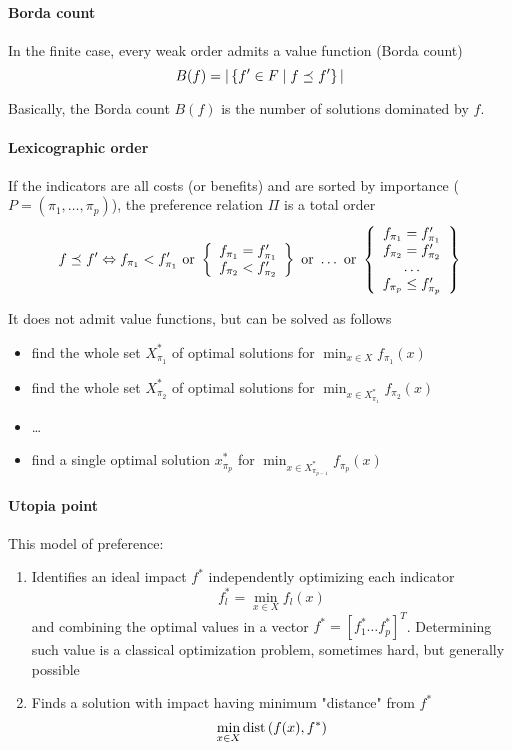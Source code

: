 \paragraph{Borda count} In the finite case, every weak order admits a value function (Borda count)
$$ B(f) = |\left\{f' \in F \mid f \preceq_{} f' \right\}|$$

Basically, the Borda count $B(f)$ is the number of solutions dominated by $f$.

\paragraph{Lexicographic order} If the indicators are all costs (or benefits) and are sorted by importance ($P = (\pi_1, \dots, \pi_p)$), the preference relation $\Pi$ is a total order
$$ f \preceq_{} f' \Leftrightarrow f_{\pi_1} < f_{\pi_1}' \text{ or } \left\{
\begin{array}{c}
	f_{\pi_1} = f_{\pi_1}' \\
	f_{\pi_2} < f_{\pi_2}' 
\end{array}\right\} \text{ or } \dots \text{ or } \left\{\begin{array}{c}
f_{\pi_1} = f_{\pi_1}' \\
f_{\pi_2} = f_{\pi_2}'  \\
\dots  \\
f_{\pi_p} \leq f_{\pi_p}'
\end{array}\right\}
$$

It does not admit value functions, but can be solved as follows
\begin{itemize}
	\item find the whole set $X^\ast_{\pi_1}$ of optimal solutions for $\min_{x \in X} f_{\pi_1}(x)$
	
	\item find the whole set $X^\ast_{\pi_2}$ of optimal solutions for $\min_{x \in X^\ast_{\pi_1}} f_{\pi_2}(x)$
	
	\item \dots
	
	\item find a single optimal solution $x^\ast_{\pi_p}$ for $\min_{x \in X^\ast_{\pi_{p-1}}} f_{\pi_p}(x)$
\end{itemize}

\paragraph{Utopia point} This model of preference:
\begin{enumerate}
	\item Identifies an ideal impact $f^\ast$ independently optimizing each indicator
	$$ f_l^\ast = \min_{x \in X} f_l (x) $$
	and combining the optimal values in a vector $f^\ast = \left[f_1^\ast \dots f_p^\ast \right]^T$. Determining such value is a classical optimization problem, sometimes hard, but generally possible
	
	\item Finds a solution with impact having minimum "distance" from $f^\ast$
	$$ \min_{x \in X} \text{dist} \left(f(x), f^\ast \right)$$
\end{enumerate}

